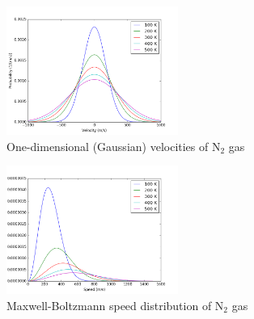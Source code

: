 \documentclass[11pt]{article}
\begin{document}
\begin{figure}[htbp]
\centering
\includegraphics[width=0.5\textwidth]{./Images/MB1D.png}
\caption{One-dimensional (Gaussian) velocities of N\(_2\) gas}
\end{figure}

\begin{figure}[htbp]
\centering
\includegraphics[width=0.5\textwidth]{./Images/MB.png}
\caption{Maxwell-Boltzmann speed distribution of N\(_2\) gas}
\end{figure}
\end{document}

